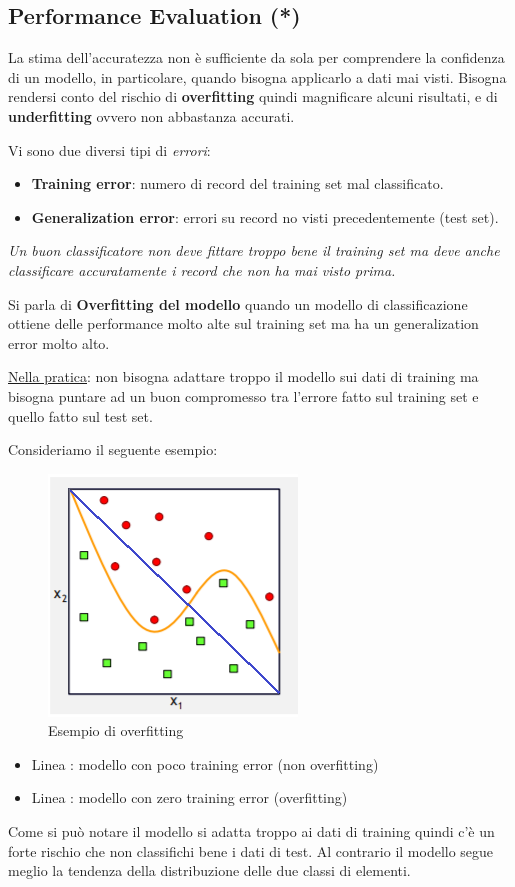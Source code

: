 \subsection{Performance Evaluation (*)}
La stima dell'accuratezza non è sufficiente da sola per comprendere la confidenza di un modello, in particolare, quando bisogna applicarlo a dati mai visti.
Bisogna rendersi conto del rischio di \textbf{overfitting} quindi magnificare alcuni risultati, e di \textbf{underfitting} ovvero non abbastanza accurati.

Vi sono due diversi tipi di \textit{errori}:
\begin{itemize}
	\item \textbf{Training error}: numero di record del training set mal classificato.
	\item \textbf{Generalization error}: errori su record no visti precedentemente (test set).
\end{itemize}
\textit{Un buon classificatore non deve fittare troppo bene il training set ma deve anche classificare accuratamente i record che non ha mai visto prima.}

\begin{defn}
	Si parla di \textbf{Overfitting del modello} quando un modello di classificazione ottiene delle performance molto alte sul training set ma ha un generalization error molto alto.
\end{defn}

\underline{Nella pratica}: non bisogna adattare troppo il modello sui dati di training ma bisogna puntare ad un buon compromesso tra l'errore fatto sul training set e quello fatto sul test set. 

Consideriamo il seguente esempio:
\begin{figure}[H]
	\centering
	\includegraphics[height=0.3 \linewidth]{classification/pict/overfitting.png}
	\caption{Esempio di overfitting}
\end{figure}
\begin{itemize}
	\item Linea {\color{blue}{blu}}: modello con poco training error (non overfitting)
	\item Linea {\color{orange}{arancione}}: modello con zero training error (overfitting)
\end{itemize}
Come si può notare il modello {\color{orange}{arancione}} si adatta troppo ai dati di training quindi c'è un forte rischio che non classifichi bene i dati di test. Al contrario il modello {\color{blue}{blu}} segue meglio la tendenza della distribuzione delle due classi di elementi.


